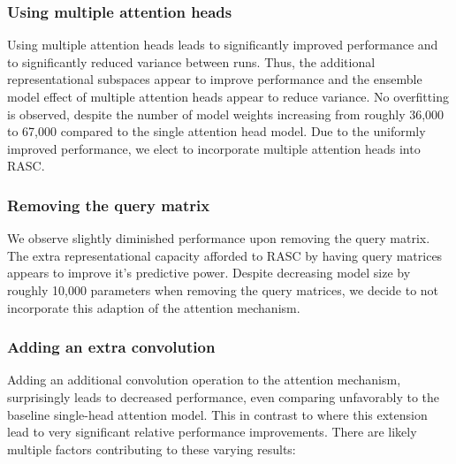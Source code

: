 \subsubsection{Using multiple attention heads} \label{subsubsec:result_heads}
Using multiple attention heads leads to significantly improved performance and to significantly reduced variance between runs. Thus, the additional representational subspaces appear to improve performance and the ensemble model effect of multiple attention heads appear to reduce variance. No overfitting is observed, despite the number of model weights increasing from roughly 36,000 to 67,000 compared to the single attention head model. Due to the uniformly improved performance, we elect to incorporate multiple attention heads into RASC. 


\subsubsection{Removing the query matrix}  %
We observe slightly diminished performance upon removing the query matrix. The extra representational capacity afforded to RASC by having query matrices appears to improve it's predictive power. Despite decreasing model size by roughly 10,000 parameters when removing the query matrices, we decide to not incorporate this adaption of the attention mechanism. 


\subsubsection{Adding an extra convolution}
Adding an additional convolution operation to the attention mechanism, surprisingly leads to decreased performance, even comparing unfavorably to the baseline single-head attention model. This in contrast to \cite{ghentransformers} where this extension lead to very significant relative performance improvements. There are likely multiple factors contributing to these varying results:

